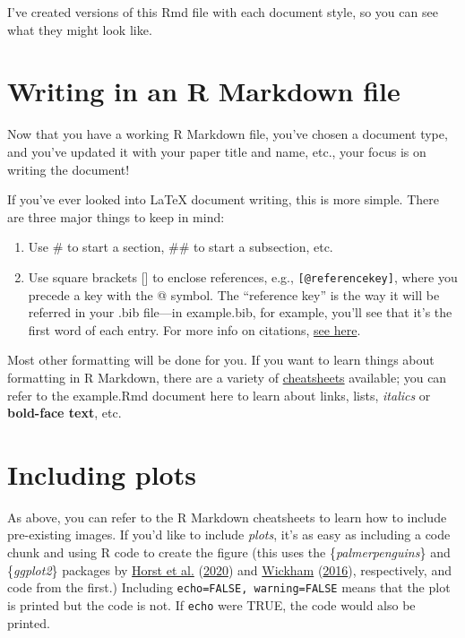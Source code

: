 \documentclass[jou]{apa7}
\providecommand{\tightlist}{%
  \setlength{\itemsep}{0pt}\setlength{\parskip}{0pt}}
\begin{document}
I've created versions of this Rmd file with each document style, so you
can see what they might look like.

\hypertarget{writing-in-an-r-markdown-file}{%
\section{Writing in an R Markdown
file}\label{writing-in-an-r-markdown-file}}

Now that you have a working R Markdown file, you've chosen a document
type, and you've updated it with your paper title and name, etc., your
focus is on writing the document!

If you've ever looked into LaTeX document writing, this is more simple.
There are three major things to keep in mind:

\begin{enumerate}
\def\labelenumi{\arabic{enumi}.}
\tightlist
\item
  Use \# to start a section, \#\# to start a subsection, etc.
\item
  Use square brackets {[}{]} to enclose references, e.g.,
  \texttt{{[}@referencekey{]}}, where you precede a key with the @
  symbol. The ``reference key'' is the way it will be referred in your
  .bib file---in example.bib, for example, you'll see that it's the
  first word of each entry. For more info on citations,
  \href{https://rmarkdown.rstudio.com/authoring_bibliographies_and_citations.html\#citations}{see
  here}.
\end{enumerate}

Most other formatting will be done for you. If you want to learn things
about formatting in R Markdown, there are a variety of
\href{https://rmarkdown.rstudio.com/lesson-15.html}{cheatsheets}
available; you can refer to the example.Rmd document here to learn about
links, lists, \emph{italics} or \textbf{bold-face text}, etc.

\hypertarget{including-plots}{%
\section{Including plots}\label{including-plots}}

As above, you can refer to the R Markdown cheatsheets to learn how to
include pre-existing images. If you'd like to include \emph{plots}, it's
as easy as including a code chunk and using R code to create the figure
(this uses the \{\emph{palmerpenguins}\} and \{\emph{ggplot2}\} packages
by \protect\hyperlink{ref-horst2020}{Horst et al.}
(\protect\hyperlink{ref-horst2020}{2020}) and
\protect\hyperlink{ref-wickham2016}{Wickham}
(\protect\hyperlink{ref-wickham2016}{2016}), respectively, and code from
the first.) Including \texttt{echo=FALSE,\ warning=FALSE} means that the
plot is printed but the code is not. If \texttt{echo} were TRUE, the
code would also be printed.
\end{document}
